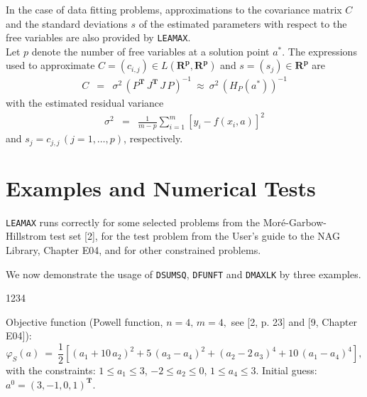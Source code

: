 In the case of data fitting problems, approximations to the covariance
matrix $C$ and the standard deviations $s$ of the estimated parameters
with respect to the free variables are also
provided by {\tt LEAMAX}. \\
Let $p$ denote the number of free variables at a solution point $a^*$.
The expressions used to approximate
$C =(c_{i,j}) \in L(\mathbf{R^p},\mathbf{R^p})$
and $s=(s_j) \in \mathbf{R^p}$ are
\begin{eqnarray*}
C & = & \sigma^2\,(P^{\mathbf{T}}\,J^{\mathbf{T}}\,J\,P)^{-1}
\ \approx \ \sigma^2 \, (H_P(a^*))^{-1}
\end{eqnarray*}
with the estimated residual variance
\begin{eqnarray*}
\sigma^2 & = & \frac{1}{m-p} \sum_{i=1}^m \left[y_i-f(x_i,a)\right]^2
\end{eqnarray*}
and $s_j=c_{j,j}\,(j=1,\ldots,p)$, respectively.

\section{Examples and Numerical Tests}

{\tt LEAMAX} runs correctly for some selected problems from the
Mor\'e-Garbow-Hillstrom test set [2], for the test problem from
the User's guide to the NAG Library, Chapter E04, and for
other constrained problems.
\par
We now demonstrate the usage of {\tt DSUMSQ}, {\tt DFUNFT} and
{\tt DMAXLK} by three examples.
\begin{DL}{1234}
\item[\mathbf{(S)}]
Objective function (Powell function, $n=4,\,m=4,$ see
[2, p. 23] and [9, Chapter E04]):
$$ \varphi_S(a) \ = \ \frac{1}{2}
\left[(a_1+10 \, a_2)^2+5 \, (a_3-a_4)^2+(a_2-2 \, a_3)^4
      +10 \, (a_1-a_4)^4\right] , $$
with the constraints:
$1 \le a_1 \le 3$, $-2 \le a_2 \le 0$, $1 \le a_4 \le 3$.
Initial guess: $a^0=(3,-1,0,1)^{\mathbf{T}}$. \\
\end{DL}

